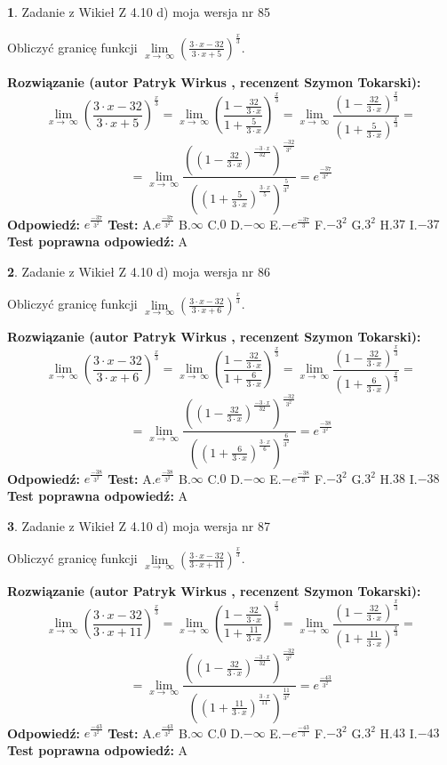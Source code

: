 \documentclass[12pt, a4paper]{article}
\theoremstyle{definition} %
\newtheorem{zad}{}
\newcommand{\zadStart}[1]{\begin{zad}#1\newline}
\newcommand{\zadStop}{\end{zad}}
\newcommand{\rozwStart}[2]{\noindent \textbf{Rozwiązanie (autor #1 , recenzent #2): }\newline}
\newcommand{\rozwStop}{\newline}
\newcommand{\odpStart}{\noindent \textbf{Odpowiedź:}\newline}
\newcommand{\odpStop}{\newline}
\newcommand{\testStart}{\noindent \textbf{Test:}\newline}
\newcommand{\testStop}{\newline}
\newcommand{\kluczStart}{\noindent \textbf{Test poprawna odpowiedź:}\newline}
\newcommand{\kluczStop}{\newline}
\begin{document}
\zadStart{Zadanie z Wikieł Z 4.10 d) moja wersja nr 85}


Obliczyć granicę funkcji  $\lim\limits_{x\to\ \infty}(\frac{3\cdot x-32}{3\cdot x+5})^{\frac{x}{3}}$.
\zadStop
\rozwStart{Patryk Wirkus}{Szymon Tokarski}
$$\lim\limits_{x\to\ \infty}(\frac{3\cdot x-32}{3\cdot x+5})^{\frac{x}{3}} = \lim\limits_{x\to\ \infty}(\frac{1-\frac{32}{3\cdot x}}{1+\frac{5}{3\cdot x}})^{\frac{x}{3}}=\lim\limits_{x\to\ \infty}\frac{(1-\frac{32}{3\cdot x})^{\frac{x}{3}}}{(1+\frac{5}{3\cdot x})^{\frac{x}{3}}}=$$
$$=\lim\limits_{x\to\ \infty}\frac{((1-\frac{32}{3\cdot x})^{\frac{-3\cdot x}{32}})^{\frac{-32}{3^{2}}}}{((1+\frac{5}{3\cdot x})^{\frac{3\cdot x}{5}})^{\frac{5}{3^{2}}}}=e^{\frac{-37}{3^{2}}}$$
\rozwStop
\odpStart
$e^{\frac{-37}{3^{2}}}$
\odpStop
\testStart
A.$e^{\frac{-37}{3^{2}}}$ B.$\infty$ C.$0$ D.$-\infty$ E.$-e^{\frac{-37}{3}}$
F.$-3^{2}$ G.$3^{2}$
H.$37$
I.$-37$
\testStop
\kluczStart
A
\kluczStop



\zadStart{Zadanie z Wikieł Z 4.10 d) moja wersja nr 86}


Obliczyć granicę funkcji  $\lim\limits_{x\to\ \infty}(\frac{3\cdot x-32}{3\cdot x+6})^{\frac{x}{3}}$.
\zadStop
\rozwStart{Patryk Wirkus}{Szymon Tokarski}
$$\lim\limits_{x\to\ \infty}(\frac{3\cdot x-32}{3\cdot x+6})^{\frac{x}{3}} = \lim\limits_{x\to\ \infty}(\frac{1-\frac{32}{3\cdot x}}{1+\frac{6}{3\cdot x}})^{\frac{x}{3}}=\lim\limits_{x\to\ \infty}\frac{(1-\frac{32}{3\cdot x})^{\frac{x}{3}}}{(1+\frac{6}{3\cdot x})^{\frac{x}{3}}}=$$
$$=\lim\limits_{x\to\ \infty}\frac{((1-\frac{32}{3\cdot x})^{\frac{-3\cdot x}{32}})^{\frac{-32}{3^{2}}}}{((1+\frac{6}{3\cdot x})^{\frac{3\cdot x}{6}})^{\frac{6}{3^{2}}}}=e^{\frac{-38}{3^{2}}}$$
\rozwStop
\odpStart
$e^{\frac{-38}{3^{2}}}$
\odpStop
\testStart
A.$e^{\frac{-38}{3^{2}}}$ B.$\infty$ C.$0$ D.$-\infty$ E.$-e^{\frac{-38}{3}}$
F.$-3^{2}$ G.$3^{2}$
H.$38$
I.$-38$
\testStop
\kluczStart
A
\kluczStop



\zadStart{Zadanie z Wikieł Z 4.10 d) moja wersja nr 87}


Obliczyć granicę funkcji  $\lim\limits_{x\to\ \infty}(\frac{3\cdot x-32}{3\cdot x+11})^{\frac{x}{3}}$.
\zadStop
\rozwStart{Patryk Wirkus}{Szymon Tokarski}
$$\lim\limits_{x\to\ \infty}(\frac{3\cdot x-32}{3\cdot x+11})^{\frac{x}{3}} = \lim\limits_{x\to\ \infty}(\frac{1-\frac{32}{3\cdot x}}{1+\frac{11}{3\cdot x}})^{\frac{x}{3}}=\lim\limits_{x\to\ \infty}\frac{(1-\frac{32}{3\cdot x})^{\frac{x}{3}}}{(1+\frac{11}{3\cdot x})^{\frac{x}{3}}}=$$
$$=\lim\limits_{x\to\ \infty}\frac{((1-\frac{32}{3\cdot x})^{\frac{-3\cdot x}{32}})^{\frac{-32}{3^{2}}}}{((1+\frac{11}{3\cdot x})^{\frac{3\cdot x}{11}})^{\frac{11}{3^{2}}}}=e^{\frac{-43}{3^{2}}}$$
\rozwStop
\odpStart
$e^{\frac{-43}{3^{2}}}$
\odpStop
\testStart
A.$e^{\frac{-43}{3^{2}}}$ B.$\infty$ C.$0$ D.$-\infty$ E.$-e^{\frac{-43}{3}}$
F.$-3^{2}$ G.$3^{2}$
H.$43$
I.$-43$
\testStop
\kluczStart
A
\kluczStop
\end{document}
